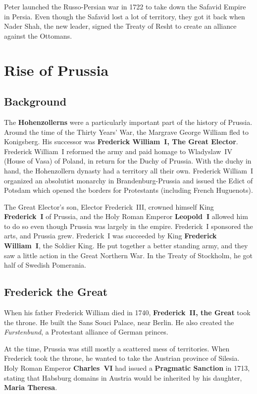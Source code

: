 Peter launched the Russo-Persian war in 1722 to take down the Safavid Empire in Persia.
Even though the Safavid lost a lot of territory,
they got it back when Nader Shah, the new leader,
signed the Treaty of Resht to create an alliance against the Ottomans.

\section{Rise of Prussia}

\subsection*{Background}

The \textbf{Hohenzollerns} were a particularly important part of the history of Prussia.
Around the time of the Thirty Years' War, the Margrave George William fled to Konigsberg.
His successor was \textbf{Frederick William~I, The Great Elector}.
Frederick William~I reformed the army and paid homage to Wladyslaw~IV (House of Vasa) of Poland,
in return for the Duchy of Prussia.
With the duchy in hand, the Hohenzollern dynasty had a territory all their own.
Frederick William~I organized an absolutist monarchy in Brandenburg-Prussia
and issued the Edict of Potsdam which opened the borders for Protestants (including French Huguenots).

The Great Elector's son, Elector Frederick~III, crowned himself King \textbf{Frederick~I} of Prussia,
and the Holy Roman Emperor \textbf{Leopold~I} allowed him to do so even though Prussia was largely in the empire.
Frederick~I sponsored the arts, and Prussia grew.
Frederick~I was succeeded by King \textbf{Frederick William~I}, the Soldier King.
He put together a better standing army, and they saw a little action in the Great Northern War.
In the Treaty of Stockholm, he got half of Swedish Pomerania.

\subsection*{Frederick the Great}

When his father Frederick William died in 1740, \textbf{Frederick~II, the Great} took the throne.
He built the Sans Souci Palace, near Berlin.
He also created the \textit{Furstenbund}, a Protestant alliance of German princes.

At the time, Prussia was still mostly a scattered mess of territories.
When Frederick took the throne, he wanted to take the Austrian province of Silesia.
Holy Roman Emperor \textbf{Charles~VI} had issued a \textbf{Pragmatic Sanction} in 1713,
stating that Habsburg domains in Austria would be inherited by his daughter, \textbf{Maria Theresa}.

